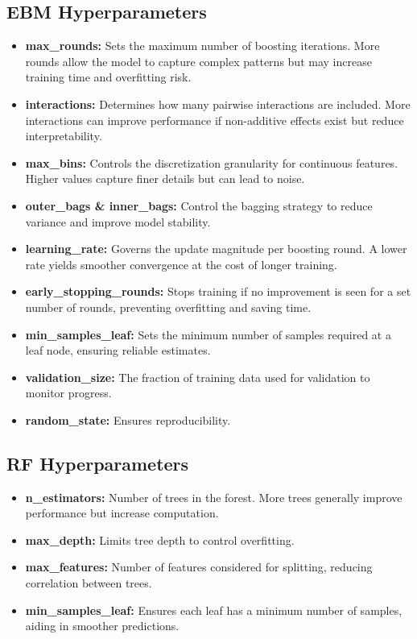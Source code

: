 \documentclass{article}
\begin{document}
\subsection*{EBM Hyperparameters}
\begin{itemize}
    \item \textbf{max\_rounds:} Sets the maximum number of boosting iterations. More rounds allow the model to capture complex patterns but may increase training time and overfitting risk.
    \item \textbf{interactions:} Determines how many pairwise interactions are included. More interactions can improve performance if non-additive effects exist but reduce interpretability.
    \item \textbf{max\_bins:} Controls the discretization granularity for continuous features. Higher values capture finer details but can lead to noise.
    \item \textbf{outer\_bags \& inner\_bags:} Control the bagging strategy to reduce variance and improve model stability.
    \item \textbf{learning\_rate:} Governs the update magnitude per boosting round. A lower rate yields smoother convergence at the cost of longer training.
    \item \textbf{early\_stopping\_rounds:} Stops training if no improvement is seen for a set number of rounds, preventing overfitting and saving time.
    \item \textbf{min\_samples\_leaf:} Sets the minimum number of samples required at a leaf node, ensuring reliable estimates.
    \item \textbf{validation\_size:} The fraction of training data used for validation to monitor progress.
    \item \textbf{random\_state:} Ensures reproducibility.
\end{itemize}

\subsection*{RF Hyperparameters}
\begin{itemize}
    \item \textbf{n\_estimators:} Number of trees in the forest. More trees generally improve performance but increase computation.
    \item \textbf{max\_depth:} Limits tree depth to control overfitting.
    \item \textbf{max\_features:} Number of features considered for splitting, reducing correlation between trees.
    \item \textbf{min\_samples\_leaf:} Ensures each leaf has a minimum number of samples, aiding in smoother predictions.
\end{itemize}
\end{document}
